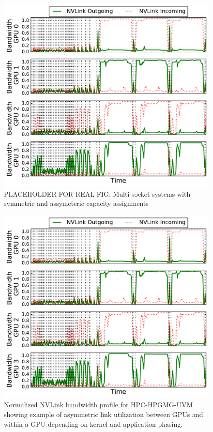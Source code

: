 \begin{figure}[t]
    \centering
    \includegraphics[width=1.0\columnwidth]{figures/bw_profile_HPGMG_UVM_base.pdf}
    \caption{PLACEHOLDER FOR REAL FIG: Multi-socket systems with symmetric and
    assymeteric capacity assignments}
    \label{fig:symmetric_assymetric}
\end{figure}

\begin{figure}[t]
    \centering
    \includegraphics[width=1.0\columnwidth]{figures/bw_profile_HPGMG_UVM_base.pdf}
    \caption{Normalized NVLink bandwidth profile for HPC-HPGMG-UVM showing example of asymmetric 
    link utilization between GPUs and within a GPU depending on kernel and application phasing.}
    \label{fig:link-motivation}
\end{figure}

